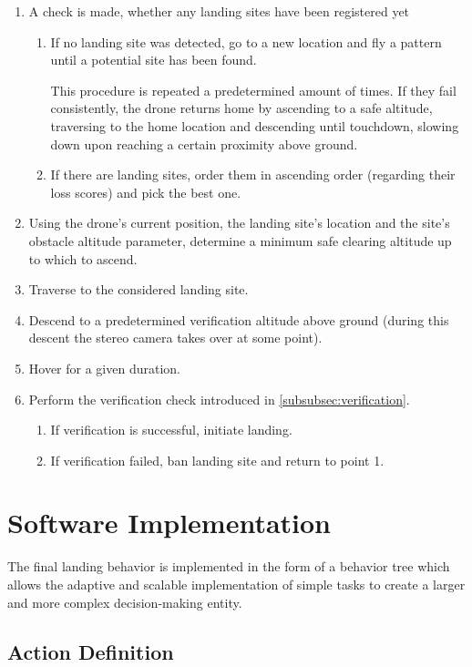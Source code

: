 \begin{enumerate}
    \item A check is made, whether any landing sites have been registered yet
    \begin{enumerate}
        \item If no landing site was detected, go to a new location and fly a pattern until a potential site has been found.

        This procedure is repeated a predetermined amount of times. If they fail consistently, the drone returns home by ascending to a safe altitude, traversing to the home location and descending until touchdown, slowing down upon reaching a certain proximity above ground.
        \item If there are landing sites, order them in ascending order (regarding their loss scores) and pick the best one.
    \end{enumerate}
    \item Using the drone's current position, the landing site's location and the site's obstacle altitude parameter, determine a minimum safe clearing altitude up to which to ascend.
    \item Traverse to the considered landing site.
    \item Descend to a predetermined verification altitude above ground (during this descent the stereo camera takes over at some point).
    \item Hover for a given duration.
    \item Perform the verification check introduced in \cref{subsubsec:verification}.
    \begin{enumerate}
        \item If verification is successful, initiate landing.
        \item If verification failed, ban landing site and return to point 1.
    \end{enumerate}
\end{enumerate}

\section{Software Implementation}\label{sec:landing_impl}

The final landing behavior is implemented in the form of a behavior tree which allows the adaptive and scalable implementation of simple tasks to create a larger and more complex decision-making entity.

\subsection{Action Definition}\label{subsec:actn_def}

